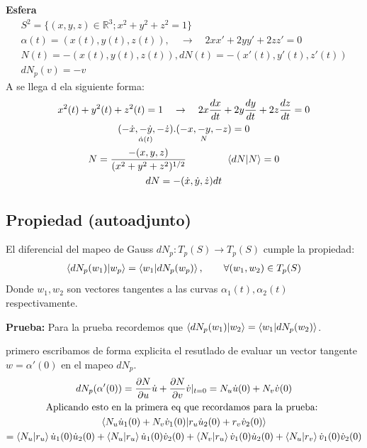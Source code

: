 \documentclass{article}
\begin{document}
\textbf{Esfera }
\begin{gather}
  S ^2 = \{ (x,y,z) \in \mathbb{R}^ {3 }; x ^2+ y ^2+ z ^2 = 1  \} \\
  \alpha(t) = (x\left(t\right), y\left(t\right), z\left(t\right)), \quad \rightarrow \quad 2x x' + 2yy' + 2zz'  = 0 \\
  N(t)= - (x\left(t\right), y\left(t\right), z\left(t\right)), dN(t) = - (x'\left(t\right), y'\left(t\right), z'\left(t\right))\\
  dN _{p } (v) = -v 
\end{gather}
A se llega d ela siguiente forma: 
\begin{gather}
  x ^2(t) + y ^2(t)+ z ^2(t) = 1 \quad \rightarrow \quad 2x \frac{d x }{d t} + 2y \frac{d y }{d t} + 2z \frac{d z }{d t} = 0 \\
  \underset{\dot \alpha(t)}{(-\dot x , - \dot y, - \dot z )}. \underset{N }{(-x,-y,-z)} = 0 \\
  N = \frac{- (x,y,z )}{(x ^2+ y ^2+ z ^2 )^ {1/2 }} \qquad \qquad \bra{dN }\ket{N } = 0 \\
  dN = -(\dot x, \dot y, \dot z )dt
\end{gather}

\subsection{Propiedad (autoadjunto)}
El diferencial del mapeo de Gauss $ dN _{p } : T _{p } (S)\rightarrow T _{p } (S) $ cumple la propiedad: 
\begin{gather}
  \bra{dN _{p } (w _{1 } )}\ket{w _{p } } = \bra{w _{1 } }\ket{dN _{p } (w _{p } )}, \qquad \forall (w_1,w_2) \in T _{p } (S)
\end{gather}
Donde $ w_1,w_2  $ son vectores tangentes a las curvas $ \alpha_1(t),\alpha_2(t) $ respectivamente. 

\hfill

\textbf{Prueba: }
Para la prueba recordemos que $ \bra{dN_p (w_1 )}\ket{w_2 } = \bra{w_1 }\ket{dN_p (w_2 )}   $.

primero escribamos de forma explicita el resutlado de evaluar un vector tangente $ w = \alpha'(0 ) $ en el mapeo $ dN _{p }  $. 
\begin{gather}
  dN_p (\alpha'(0)) = \frac{\partial N }{\partial u}\dot u + \frac{\partial N }{\partial v}\dot v |_{t=0 }  = N_u \dot u (0) + N_v \dot v(0)\\
\text{Aplicando esto en la primera eq que recordamos para la prueba: }\\
  \bra{N_u \dot u_1(0)+ N_v \dot v_1(0)}\ket{r_u \dot u _2 (0) + r_v \dot v_2 (0)} \\
  = \bra{N_u }\ket{r_u }\dot u_1(0) \dot u_2(0) + \bra{N_u }\ket{r_u }\dot u_1(0)\dot v_2(0)+ \bra{N_v }\ket{r_u }\dot v_1(0)\dot u _2 (0) + \bra{N_u }\ket{r_v }\dot v_1 (0)\dot v_2(0)\\
\end{gather}
\end{document}
